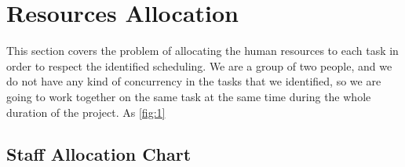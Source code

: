 \section{Resources Allocation}
This section covers the problem of allocating the human resources to each task in order to respect the identified scheduling.
We are a group of two people, and we do not have any kind of concurrency in the tasks that we identified, so we are going to work together on the same task at the same time during the whole duration of the project.
As \ref{fig:1}
%
\subsection{Staff Allocation Chart}

\begin{center}
	\begin{ganttchart}[hgrid=true, x unit=2.2mm, link bulge=0.75]{1}{42}
		  \\
		  \\
		  
	\end{ganttchart}
\end{center}
%